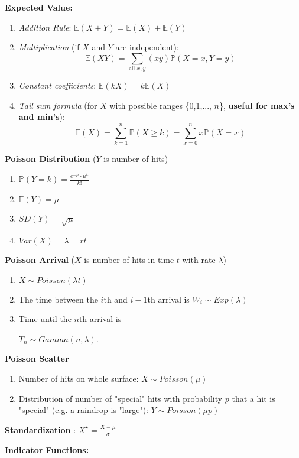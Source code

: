 \documentclass[titlepage, 12pt, leqno]{article}
\begin{document}
\begin{multicols*}{2}
\textbf{Expected Value:}
\begin{enumerate}
    \item \textit{Addition Rule}: $ \mathbb{E}(X+Y) = \mathbb{E}(X) + 
        \mathbb{E}(Y)$
    \item \textit{Multiplication} (if $X$ and $Y$ are independent):
        \[
            \mathbb{E}(XY) = \sum_{ \text{all }x,y}(xy)\mathbb{P}(X=x,Y=y)
        \]
    \item \textit{Constant coefficients}: $ \mathbb{E}(kX) = k \mathbb{E}(X)$ 
    \item \textit{Tail sum formula} (for $X$ with possible ranges 
        \{0,1,..., $n$\}, \textbf{useful for max's and min's}):
        \[
            \mathbb{E}(X) = \sum_{k=1}^{n} \mathbb{P}(X \ge k) =
            \sum_{x=0}^{n}x \mathbb{P}(X=x)
        \]
\end{enumerate}
\textbf{Poisson Distribution} ($Y$ is number of hits)
\begin{enumerate}
    \item $\mathbb{P}(Y=k) = \frac{e^{-\mu}\cdot\mu^k}{k!}$
    \item $ \mathbb{E}(Y) = \mu$
    \item $SD(Y) = \sqrt{\mu}$
    \item $Var(X) = \lambda = rt$
\end{enumerate}
\textbf{Poisson Arrival} ($X$ is number of hits in time $t$ with rate $\lambda$)
\begin{enumerate}
    \item $X \sim Poisson(\lambda t)$
    \item The time between the $i$th and $i-1$th arrival is $W_i \sim 
        Exp(\lambda)$
    \item Time until the $n$th arrival is 

        $T_n \sim Gamma(n, \lambda)$.
\end{enumerate}

\textbf{Poisson Scatter}
\begin{enumerate}
    \item Number of hits on whole surface: $X \sim Poisson(\mu)$
    \item Distribution of number of "special" hits with probability $p$ that a hit
        is "special" (e.g. a raindrop is "large"): $Y \sim Poisson(\mu p)$
\end{enumerate}

\textbf{Standardization} : $X^\star = \frac{X-\mu}{\sigma}$

\textbf{Indicator Functions:}
\end{multicols*}
\end{document}
